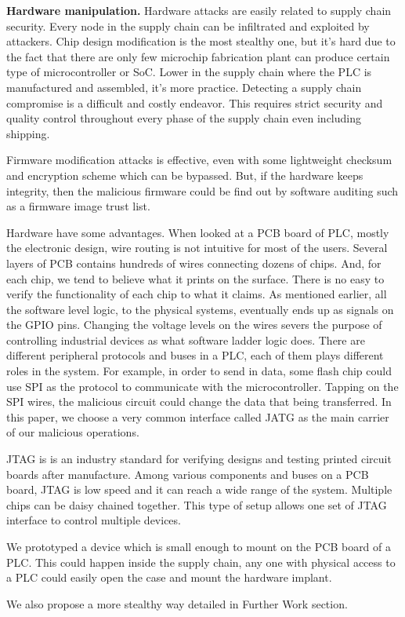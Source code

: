 \textbf{Hardware manipulation.} Hardware attacks are easily related to supply chain security. Every node in the supply chain can be infiltrated and exploited by attackers. Chip design modification is the most stealthy one, but it's hard due to the fact that there are only few microchip fabrication plant can produce certain type of microcontroller or SoC. Lower in the supply chain where the PLC is manufactured and assembled, it's more practice. Detecting a supply chain compromise is a difficult and costly endeavor. This requires strict security and quality control throughout every phase of the supply chain even including shipping.

Firmware modification attacks is effective, even with some lightweight checksum and encryption scheme which can be bypassed. But, if the hardware keeps integrity, then the malicious firmware could be find out by software auditing such as a firmware image trust list.

Hardware have some advantages. When looked at a PCB board of PLC, mostly the electronic design, wire routing is not intuitive for most of the users. Several layers of PCB contains hundreds of wires connecting dozens of chips. And, for each chip, we tend to believe what it prints on the surface. There is no easy to verify the functionality of each chip to what it claims. As mentioned earlier, all the software level logic, to the physical systems, eventually ends up as signals on the GPIO pins. Changing the voltage levels on the wires severs the purpose of controlling industrial devices as what software ladder logic does. There are different peripheral protocols and buses in a PLC, each of them plays different roles in the system. For example, in order to send in data, some flash chip could use SPI as the protocol to communicate with the microcontroller. Tapping on the SPI wires, the malicious circuit could change the data that being transferred. In this paper, we choose a very common interface called JATG as the main carrier of our malicious operations.   

JTAG is is an industry standard for verifying designs and testing printed circuit boards after manufacture. Among various components and buses on a PCB board, JTAG is low speed and it can reach a wide range of the system. Multiple chips can be daisy chained together. This type of setup allows one set of JTAG interface to control multiple devices.

We prototyped a device which is small enough to mount on the PCB board of a PLC. This could happen inside the supply chain, any one with physical access to a PLC could easily open the case and mount the hardware implant.

We also propose a more stealthy way detailed in Further Work section.



